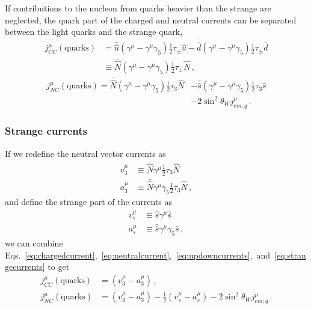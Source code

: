   If contributions to the nucleon from quarks heavier than the strange are
  neglected, the quark part of the charged and neutral currents can be
  separated between the light quarks and the strange
  quark,~\cite{Alberico:2001sd}
  \begin{equation}\label{eq:chargedcurrent}
    \begin{aligned}
    j^{\mu}_{CC}(\textrm{quarks}) &= \bar{\hat{u}}(\gamma^{\mu} 
                - \gamma^{\mu}\gamma_5)\frac{1}{2}\tau_{\pm}\hat{u}
                - \bar{\hat{d}}(\gamma^{\mu} - \gamma^{\mu}\gamma_5)\frac{1}{2}\tau_{\pm}\hat{d} \\
                 &\equiv \bar{\hat{N}}(\gamma^{\mu} 
                - \gamma^{\mu}\gamma_5)\frac{1}{2}\tau_{\pm}\hat{N} \,,
    \end{aligned}
  \end{equation}
  \begin{equation}\label{eq:neutralcurrent}
    \begin{aligned}
    j^{\mu}_{NC}(\textrm{quarks}) = \bar{\hat{N}}(\gamma^{\mu} 
                - \gamma^{\mu}\gamma_5)\frac{1}{2}\tau_3\hat{N} 
                &- \bar{\hat{s}}(\gamma^{\mu} - \gamma^{\mu}\gamma_5)\frac{1}{2}\tau_3\hat{s}  \\
                  &- 2\sin^2\theta_W j^{\mu}_{em;q} \,.
    \end{aligned}
  \end{equation}

  \subsubsection{Strange currents}
    If we redefine the neutral vector currents as
    \begin{equation}\label{eq:updowncurrents}
      \begin{aligned}
        v^{\mu}_3 &\equiv \bar{\hat{N}} \gamma^{\mu}\frac{1}{2}\tau_3 \hat{N} \\
        a^{\mu}_3 &\equiv \bar{\hat{N}} \gamma^{\mu}\gamma_5\frac{1}{2}\tau_3 \hat{N} \,,
      \end{aligned}
    \end{equation}
    and define the strange part of the currents as
    \begin{equation}\label{eq:strangecurrents}
      \begin{aligned}
        v^{\mu}_s &\equiv \bar{\hat{s}} \gamma^{\mu} \hat{s} \\
        a^{\mu}_s &\equiv \bar{\hat{s}} \gamma^{\mu}\gamma_5 \hat{s} \,,
      \end{aligned}
    \end{equation}
    we can combine
    Eqs.~\ref{eq:chargedcurrent},~\ref{eq:neutralcurrent},~\ref{eq:updowncurrents},~and~\ref{eq:strangecurrents}
    to get
    \begin{align}
      j^{\mu}_{CC}(\textrm{quarks}) &= (v^{\mu}_3 - a^{\mu}_3) \,, \\
      j^{\mu}_{NC}(\textrm{quarks}) &= (v^{\mu}_3 - a^{\mu}_3) 
        - \frac{1}{2}(v^{\mu}_s - a^{\mu}_s) - 2\sin^2\theta_W j^{\mu}_{em;q} \,.
    \end{align}
    
